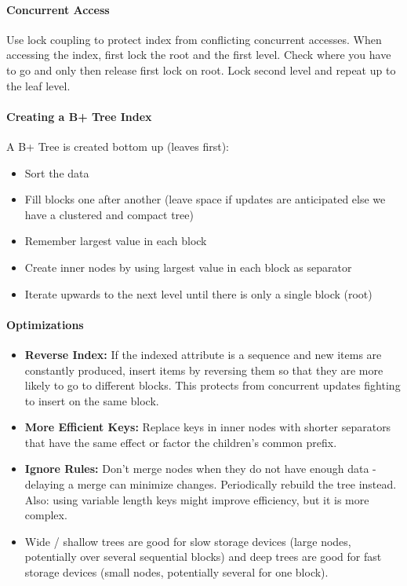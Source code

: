 \paragraph{Concurrent Access}
Use lock coupling to protect index from conflicting concurrent accesses. When accessing the index, first lock the root and the first level. Check where you have to go and only then release first lock on root. Lock second level and repeat up to the leaf level. %


\paragraph{Creating a B+ Tree Index}
A B+ Tree is created bottom up (leaves first):

\begin{itemize}
    \item Sort the data
    \item Fill blocks one after another (leave space if updates are anticipated else we have a clustered and compact tree)
    \item Remember largest value in each block %
    \item Create inner nodes by using largest value in each block as separator
    \item Iterate upwards to the next level until there is only a single block (root)
\end{itemize}

\paragraph{Optimizations}
\begin{itemize}
    \item \textbf{Reverse Index:} If the indexed attribute is a sequence and new items are constantly produced, insert items by reversing them so that they are more likely to go to different blocks. This protects from concurrent updates fighting to insert on the same block.
    \item \textbf{More Efficient Keys:} Replace keys in inner nodes with shorter separators that have the same effect or factor the children's common prefix. %
    \item \textbf{Ignore Rules:} Don't merge nodes when they do not have enough data - delaying a merge can minimize changes. Periodically rebuild the tree instead. Also: using variable length keys might improve efficiency, but it is more complex. %
    \item Wide / shallow trees are good for slow storage devices (large nodes, potentially over several sequential blocks) and deep trees are good for fast storage devices (small nodes, potentially several for one block).
\end{itemize} %


